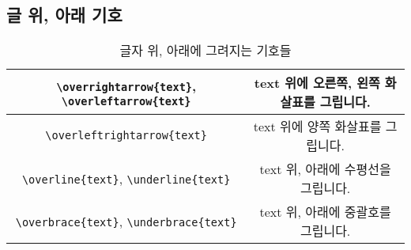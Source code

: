 \subsection{글 위, 아래 기호}
\begin{table}[hp]
	\centering
	\begin{tabular}{|c|c|}
		\hline
		\verb|\overrightarrow{text}|, \verb|\overleftarrow{text}| & text 위에 오른쪽, 왼쪽 화살표를 그립니다.\\
		\hline
		\verb|\overleftrightarrow{text}| & text 위에 양쪽 화살표를 그립니다.\\
		\hline
		\verb|\overline{text}|, \verb|\underline{text}| & text 위, 아래에 수평선을 그립니다.\\
		\hline
		\verb|\overbrace{text}|, \verb|\underbrace{text}| & text 위, 아래에 중괄호를 그립니다.\\
		\hline
	\end{tabular}
	\caption{글자 위, 아래에 그려지는 기호들}
	\label{tab:overunder}
\end{table}

